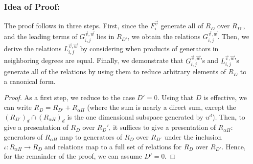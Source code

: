 \documentclass{amsart}
\theoremstyle{plain}
\theoremstyle{definition}
\theoremstyle{remark}
\numberwithin{equation}{section}
\newcommand\sssec{\subsubsection}
\newcommand\bn{{\mathbb N}}
\newcommand\bp{{\mathbb P}}
\newcommand\bz{{\mathbb Z}}
\newcommand\mss{\mathscr{S}}
\begin{document}
\sssec*{Idea of Proof:}
The proof follows in three steps. 
First, since the
$F_{i}^{\vec{v}}$ generate
all of $R_D$ over $R_{D'}$, and the leading terms of
$G_{i,j}^{\vec v, \vec w}$ lies in $R_{D'}$, we obtain the
relations $G_{i, j}^{\vec{v}, \vec{w}}$. 
Then, we derive the relations
$L_{i, j}^{\vec{v}, \vec{w}}$ by considering when products of
generators in neighboring degrees are equal. Finally, we demonstrate
that $G_{i, j}^{\vec{v}, \vec{w}}$'s and $L_{i, j}^{\vec{v}, \vec{w}}$'s
generate all of the relations by using them to reduce arbitrary
elements of
$R_D$ to a canonical form.

\begin{proof}
As a first step, we reduce to the case $D' = 0$.
Using that $D$ is effective, we can write
$R_D = R_{D'} + R_{\alpha H}$ (where the sum is nearly a direct sum, except 
the $(R_{D'})_d \cap (R_{\alpha H})_d$ is the one dimensional subspace generated by $u^d$).
Then, to give a presentation of $R_D$ over $R_D'$,
it suffices to give a presentation of $R_{\alpha H}$:
generators of $R_{\alpha H}$ map to generators of $R_D$ over $R_{D'}$ under the inclusion $\iota: R_{\alpha H} \rightarrow R_D$
and relations map to a full set of relations for $R_D$ over $R_{D'}$.
Hence, for the remainder of the proof, we can assume $D' = 0$.

%
%


\end{proof}
\end{document}
